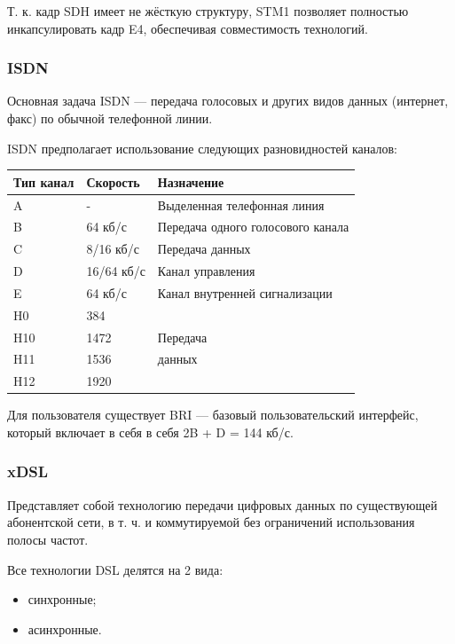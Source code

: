 \documentclass[12pt, russian, oneside, article]{ncc}
\begin{document}
Т. к. кадр SDH имеет не жёсткую структуру, STM1 позволяет полностью инкапсулировать кадр E4, обеспечивая совместимость технологий.
\subsubsection{ISDN}
\label{sec-5_2_9}


Основная задача ISDN --- передача голосовых и других видов данных (интернет, факс) по обычной телефонной линии.

ISDN предполагает использование следующих разновидностей каналов:


\begin{center}
\begin{tabular}{lll}
 Тип канал  &  Скорость    &  Назначение                         \\
\hline
 A          &  -           &  Выделенная телефонная линия        \\
 B          &  64 кб/с     &  Передача одного голосового канала  \\
 C          &  8/16 кб/с   &  Передача данных                    \\
 D          &  16/64 кб/с  &  Канал управления                   \\
 E          &  64 кб/с     &  Канал внутренней сигнализации      \\
 H0         &  384         &                                     \\
 H10        &  1472        &  Передача                           \\
 H11        &  1536        &  данных                             \\
 H12        &  1920        &                                     \\
\end{tabular}
\end{center}



Для пользователя существует BRI --- базовый пользовательский интерфейс, который включает в себя в себя 2B + D = 144 кб/с.
\subsubsection{xDSL}
\label{sec-5_2_10}


Представляет собой технологию передачи цифровых данных по существующей абонентской сети, в т. ч. и коммутируемой без ограничений использования полосы частот.

Все технологии DSL делятся на 2 вида:
\begin{itemize}
\item синхронные;
\item асинхронные.
\end{itemize}
\end{document}
